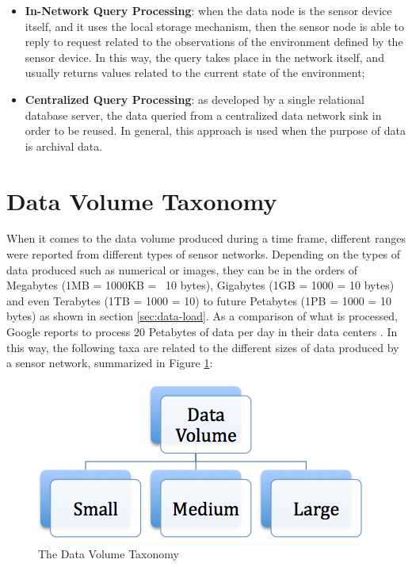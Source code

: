 \begin{itemize}
  \item \textbf{In-Network Query Processing}: when the data node is the
  sensor device itself, and it uses the local storage mechanism, then the
  sensor node is able to reply to request related to the observations of the 
  environment defined by the sensor device. In this way, the query takes 
  place in the network itself, and usually returns values related to the current
  state of the environment;
  \item \textbf{Centralized Query Processing}: as developed by a single 
  relational database server, the data queried from a centralized data
  network sink in order to be reused. In general, this approach is used when
  the purpose of data is archival data.
\end{itemize}

\section{Data Volume Taxonomy}

When it comes to the data volume produced during a time frame, different ranges
were reported from different types of sensor networks. Depending on the types
of data produced such as numerical or images, they can be in the orders of
Megabytes (1MB = 1000KB = ~10 bytes), Gigabytes (1GB =
1000 = 10 bytes) and even Terabytes (1TB =
1000 = 10) to future Petabytes (1PB =
1000 = 10 bytes) as shown in section
\ref{sec:data-load}. As a comparison of what is processed, Google reports to
process 20 Petabytes of data per day in their data centers
\cite{map-reduce-load}. In this way, the following taxa are related to the
different sizes of data produced by a sensor network, summarized in Figure
\ref{fig:taxonomy-data-volume}:

\begin{figure}[h]
  \centering
  \includegraphics[scale=0.5]{../diagrams/taxonomy-data-volume}
  \caption{The Data Volume Taxonomy}
  \label{fig:taxonomy-data-volume}
\end{figure}

